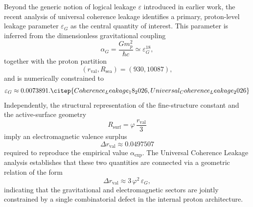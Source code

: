 \documentclass{article}
\begin{document}
Beyond the generic notion of logical leakage $\varepsilon$ introduced in earlier work, the recent analysis of universal coherence leakage identifies a primary, proton-level leakage parameter $\varepsilon_G$ as the central quantity of interest.\citep{Universal_Coherence_Leakage_2026}
This parameter is inferred from the dimensionless gravitational coupling
\[
\alpha_G = \frac{G m_p^2}{\hbar c} \simeq \varepsilon_G^{18},
\]
together with the proton partition
\[
(r_{\mathrm{val}}, R_{\mathrm{sea}}) = (930, 10087),
\]
and is numerically constrained to
\[
\varepsilon_G \approx 0.0073891.\citep{Coherence_Leakage_18_2026,Universal_Coherence_Leakage_2026}
\]
Independently, the structural representation of the fine-structure constant and the active-surface geometry
\[
R_{\mathrm{surf}} = \varphi\,\frac{r_{\mathrm{val}}}{3}
\]
imply an electromagnetic valence surplus
\[
\Delta r_{\mathrm{val}} \approx 0.0497507
\]
required to reproduce the empirical value $\alpha_{\exp}$.\citep{Alpha_PDL_v2_2026}
The Universal Coherence Leakage analysis establishes that these two quantities are connected via a geometric relation of the form
\[
\Delta r_{\mathrm{val}} \approx 3\,\varphi^2\,\varepsilon_G,
\]
indicating that the gravitational and electromagnetic sectors are jointly constrained by a single combinatorial defect in the internal proton architecture.
\end{document}
